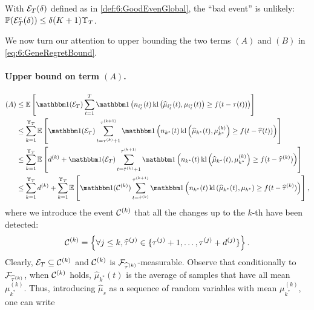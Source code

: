\begin{lemma}\label{lem:6:GoodEventGlobal}
    With $\mathcal{E}_T(\delta)$ defined as in \eqref{def:6:GoodEvenGlobal}, the ``bad event'' is unlikely:
    $\mathbb{P}(\mathcal{E}_T^c(\delta)) \leq \delta(K+1)\Upsilon_T$.
\end{lemma}

We now turn our attention to upper bounding the two terms $(A)$ and $(B)$ in \eqref{eq:6:GeneRegretBound}.


\paragraph{Upper bound on term $(A)$.}

\begin{align*}
    (A) & \leq \bE\left[\indic(\cE_T) \sum_{t=1}^T \indic\left(n_{i_t^*}(t) \, \kl\left(\widehat{\mu}_{i_t^*}(t), \mu_{i_t^*}(t)\right) \geq f(t - \tau(t))\right)\right] \\
     & \leq \sum_{k=1}^{\Upsilon_T}\bE\left[\indic(\cE_T) \sum_{t=\tau^{(k)}+1}^{\tau^{(k+1)}} \indic\left(n_{k^*}(t) \, \kl\left(\widehat{\mu}_{k^*}(t), \mu_{k^*}^{(k)}\right) \geq f(t - \widehat{\tau}(t))\right)\right] \\
    & \leq \sum_{k=1}^{\Upsilon_T}\bE\left[ d^{(k)} + \indic(\cE_T) \sum_{t=\hat{\tau}^{(k)}+1}^{\tau^{(k+1)}} \indic\left(n_{k^*}(t) \, \kl\left(\widehat{\mu}_{k^*}(t), \mu_{k^*}^{(k)}\right) \geq f(t - \widehat{\tau}^{(k)})\right)\right] \\
    & \leq \sum_{k=1}^{\Upsilon_T}d^{(k)} + \sum_{k=1}^{\Upsilon_T}\bE\left[\indic(\cC^{(k)}) \sum_{t=\hat{\tau}^{(k)}}^{\tau^{(k+1)}}\indic\left(n_{k^*}(t) \, \kl\left(\widehat{\mu}_{k^*}(t), \mu_{k^*}\right) \geq f(t - \widehat{\tau}^{(k)})\right)\right],
\end{align*}
%
where we introduce the event $\mathcal{C}^{(k)}$ that all the changes up to the $k$-th have been detected:
%
\begin{equation}\label{def:6:EventCiGlobal}
    \mathcal{C}^{(k)} = \left\{\forall j \leq k, \widehat{\tau}^{(j)} \in \{\tau^{(j)} + 1, \dots, \tau^{(j)} + d^{(j)} \} \right\}.
\end{equation}
%
Clearly, $\mathcal{E}_T \subseteq \mathcal{C}^{(k)}$ and $\mathcal{C}^{(k)}$ is $\mathcal{F}_{\widehat{\tau}^{(k)}}$-measurable. Observe that conditionally to $\mathcal{F}_{\widehat{\tau}^{(k)}}$, when $\mathcal{C}^{(k)}$ holds, $\widehat{\mu}_{k^*}(t)$ is the average of samples that have all mean $\mu_{k^*}^{(k)}$.
%
Thus, introducing $\widehat{\mu}_s$ as a sequence of \iid{} random variables with mean $\mu_{k^*}^{(k)}$, one can write

